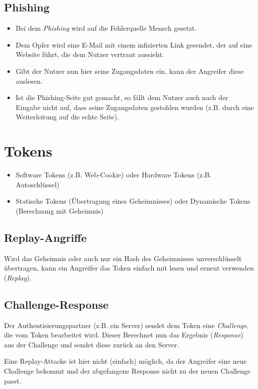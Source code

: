 		\subsection{Phishing}
			\begin{itemize}
				\item Bei dem \textit{Phishing} wird auf die Fehlerquelle Mensch gesetzt.
				\item Dem Opfer wird eine E-Mail mit einem infizierten Link gesendet, der auf eine Website führt, die dem Nutzer vertraut aussieht.
				\item Gibt der Nutzer nun hier seine Zugangsdaten ein, kann der Angreifer diese auslesen.
				\item Ist die Phishing-Seite gut gemacht, so fällt dem Nutzer auch nach der Eingabe nicht auf, dass seine Zugangsdaten gestohlen wurden (z.B. durch eine Weiterleitung auf die echte Seite).
			\end{itemize}

	\section{Tokens}
		\begin{itemize}
			\item Software Tokens (z.B. Web-Cookie) oder Hardware Tokens (z.B. Autoschlüssel)
			\item Statische Tokens (Übertragung eines Geheimnisses) oder Dynamische Tokens (Berechnung mit Geheimnis)
		\end{itemize}

		\subsection{Replay-Angriffe}
			Wird das Geheimnis oder auch nur ein Hash des Geheimnisses unverschlüsselt übertragen, kann ein Angreifer das Token einfach mit lesen und erneut verwenden (\textit{Replay}).

		\subsection{Challenge-Response}
			Der Authentisierungspartner (z.B. ein Server) sendet dem Token eine \textit{Challenge}, die vom Token bearbeitet wird. Dieser Berechnet nun das Ergebnis (\textit{Response}) aus der Challenge und sendet diese zurück an den Server.

			Eine Replay-Attacke ist hier nicht (einfach) möglich, da der Angreifer eine neue Challenge bekommt und der abgefangene Response nicht zu der neuen Challenge passt.

